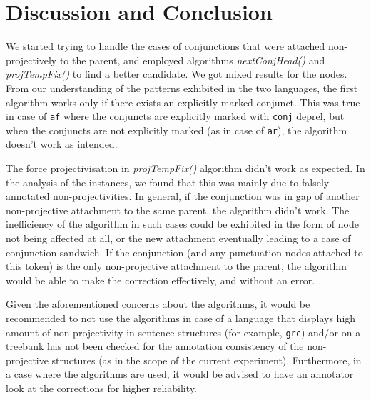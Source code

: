 \section{Discussion and Conclusion}

We started trying to handle the cases of conjunctions that were attached non-projectively to the parent, and employed algorithms \textit{nextConjHead()} and \textit{projTempFix()} to find a better candidate. We got mixed results for the nodes. From our understanding of the patterns exhibited in the two languages, the first algorithm works only if there exists an explicitly marked conjunct. This was true in case of \verb|af| where the conjuncts are explicitly marked with \verb|conj| deprel, but when the conjuncts are not explicitly marked (as in case of \verb|ar|), the algorithm doesn't work as intended. 

The force projectivisation in \textit{projTempFix()} algorithm didn't work as expected. In the analysis of the instances, we found that this was mainly due to falsely annotated non-projectivities. In general, if the conjunction was in gap of another non-projective attachment to the same parent, the algorithm didn't work. The inefficiency of the algorithm in such cases could be exhibited in the form of node not being affected at all, or the new attachment eventually leading to a case of conjunction sandwich. If the conjunction (and any punctuation nodes attached to this token) is the only non-projective attachment to the parent, the algorithm would be able to make the correction effectively, and without an error.

Given the aforementioned concerns about the algorithms, it would be recommended to not use the algorithms in case of a language that displays high amount of non-projectivity in sentence structures (for example, \verb|grc|) and/or on a treebank has not been checked for the annotation consistency of the non-projective structures (as in the scope of the current experiment). Furthermore, in a case where the algorithms are used, it would be advised to have an annotator look at the corrections for higher reliability.


